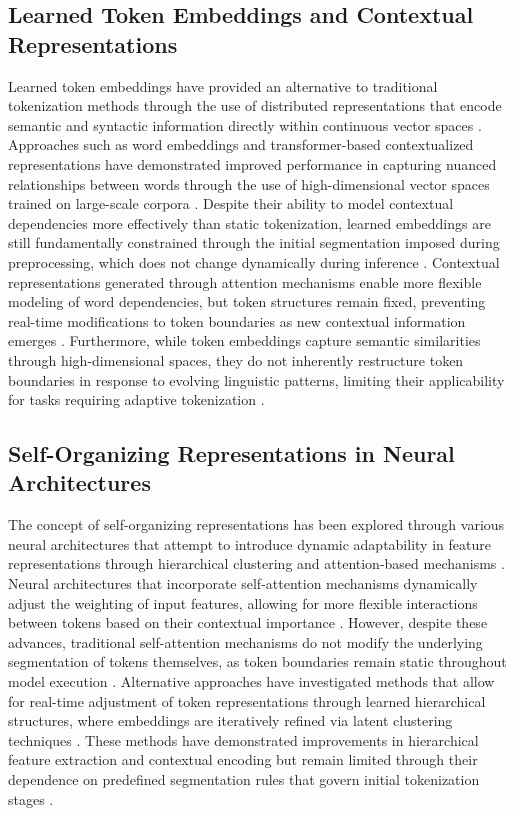 \documentclass{article}
\begin{document}
\subsection{Learned Token Embeddings and Contextual Representations}

Learned token embeddings have provided an alternative to traditional tokenization methods through the use of distributed representations that encode semantic and syntactic information directly within continuous vector spaces \cite{harrington2024recursive}. Approaches such as word embeddings and transformer-based contextualized representations have demonstrated improved performance in capturing nuanced relationships between words through the use of high-dimensional vector spaces trained on large-scale corpora \cite{ga2024evaluating}. Despite their ability to model contextual dependencies more effectively than static tokenization, learned embeddings are still fundamentally constrained through the initial segmentation imposed during preprocessing, which does not change dynamically during inference \cite{farmer2024optimizing}. Contextual representations generated through attention mechanisms enable more flexible modeling of word dependencies, but token structures remain fixed, preventing real-time modifications to token boundaries as new contextual information emerges \cite{shao2024automated}. Furthermore, while token embeddings capture semantic similarities through high-dimensional spaces, they do not inherently restructure token boundaries in response to evolving linguistic patterns, limiting their applicability for tasks requiring adaptive tokenization \cite{barbere2024dynamic, blackwood2024implementation}.

\subsection{Self-Organizing Representations in Neural Architectures}

The concept of self-organizing representations has been explored through various neural architectures that attempt to introduce dynamic adaptability in feature representations through hierarchical clustering and attention-based mechanisms \cite{lapov2024dynamic}. Neural architectures that incorporate self-attention mechanisms dynamically adjust the weighting of input features, allowing for more flexible interactions between tokens based on their contextual importance \cite{lococ2024token}. However, despite these advances, traditional self-attention mechanisms do not modify the underlying segmentation of tokens themselves, as token boundaries remain static throughout model execution \cite{mcintosh2024reasoning}. Alternative approaches have investigated methods that allow for real-time adjustment of token representations through learned hierarchical structures, where embeddings are iteratively refined via latent clustering techniques \cite{ashger2024contextual, behore2024enhancing}. These methods have demonstrated improvements in hierarchical feature extraction and contextual encoding but remain limited through their dependence on predefined segmentation rules that govern initial tokenization stages \cite{chen2024dynamic}.
\end{document}
